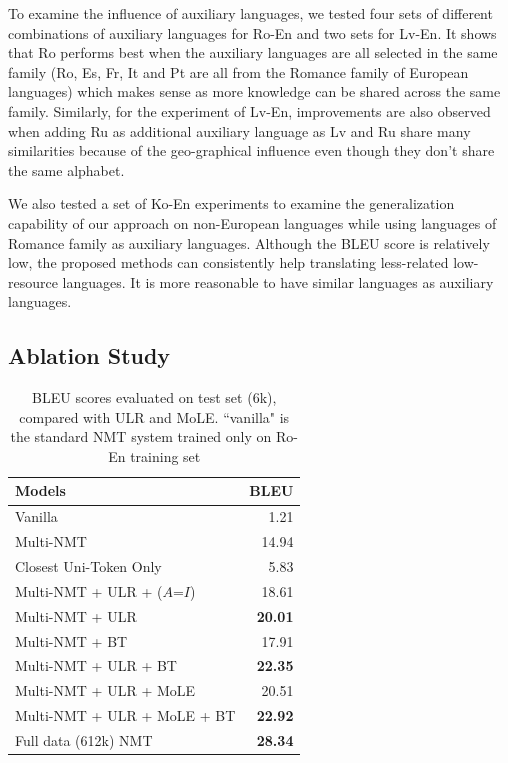 To examine the influence  of auxiliary languages, we tested four sets of different combinations of auxiliary languages for Ro-En and two sets for Lv-En. It shows that Ro performs best when the auxiliary languages are all selected in the same family (Ro, Es, Fr, It and Pt are all from the Romance family of European languages) which makes sense as more knowledge can be shared across the same family. Similarly, for the experiment of Lv-En, improvements are also observed when adding Ru as additional auxiliary language as Lv and Ru share many similarities because of the geo-graphical influence even though they don't share the same alphabet. 

We also tested a set of Ko-En experiments to examine the generalization capability of our approach on  non-European languages while using languages of Romance family as auxiliary languages. Although the BLEU score is relatively low, the proposed methods can consistently help  translating less-related low-resource languages. It is more reasonable to have  similar languages as auxiliary languages.



\subsection{Ablation Study}
\begin{table}[t]
 	\centering
    \begin{tabular}{l|r}
    Models                   & BLEU  \\ \hline
    Vanilla                        & 1.21   \\
    Multi-NMT                 & 14.94 \\ \hline
    Closest Uni-Token Only        & 5.83  \\
    Multi-NMT + ULR + ($A$=$I$) & 18.61 \\ 
    Multi-NMT + ULR       & \textbf{20.01} \\ \hline
    Multi-NMT + BT & 17.91 \\
    Multi-NMT + ULR + BT & \textbf{22.35} \\  \hline
    Multi-NMT + ULR + MoLE & 20.51 \\
    Multi-NMT + ULR + MoLE + BT & \textbf{22.92} \\ \hline\hline
    Full data (612k) NMT & \textbf{28.34} \\
    \end{tabular}
    \caption{\label{ro_test1} BLEU scores evaluated on test set (6k), compared with ULR and MoLE. ``vanilla" is the standard NMT system trained only on Ro-En training set}
\end{table}


